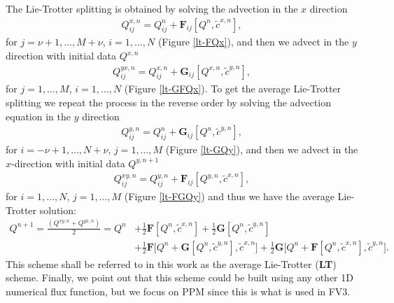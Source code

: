 The Lie-Trotter splitting is obtained by solving the advection in the $x$ direction
\begin{align*}
	{Q}^{x,n}_{ij} =  {Q}^{n}_{ij} + \mathbf{F}_{ij}[{Q^n}, \tilde{c}^{x,n}],
\end{align*}
for $j=\nu+1, \ldots, M+\nu$, $i=1, \ldots, N$ (Figure \ref{lt-FQx}), and then we advect in the $y$ direction with initial data ${Q}^{x,n}$ 
\begin{align*}
	{Q}^{yx,n}_{ij} = Q^{x,n}_{ij} + \mathbf{G}_{ij}[{Q}^{x,n},\tilde{c}^{y,n}],
\end{align*}
for $j=1, \ldots, M$,  $i=1, \ldots, N$  (Figure \ref{lt-GFQx}).
To get the average Lie-Trotter splitting we repeat the process in the reverse order by solving the advection equation
in the $y$ direction
\begin{align*}
	{Q}^{y,n}_{ij} =  {Q}^{n}_{ij} + \mathbf{G}_{ij}[{Q^n},\tilde{c}^{y,n}],
\end{align*}
for $i=-\nu+1, \ldots, N+\nu$, $j=1, \ldots, M$ (Figure \ref{lt-GQy}), and then we advect in the $x$-direction with initial data ${Q}^{y,n+1}$ 
\begin{align*}
	{Q}^{xy,n}_{ij} = Q^{y,n}_{ij} + \mathbf{F}_{ij}[Q^{y,n},\tilde{c}^{x,n}],
\end{align*}
for $i=1, \ldots, N$, $j=1, \ldots, M$ (Figure \ref{lt-FGQy}) and thus we have the average Lie-Trotter solution:
\begin{align}
\label{chp-adv2d-LT}
    Q^{n+1} = \frac{(Q^{xy,n} + Q^{yx,n})}{2} 
    = Q^n &+ \frac{1}{2}\mathbf{F}[Q^n,\tilde{c}^{x,n}] + \frac{1}{2}\mathbf{G}[Q^n,\tilde{c}^{y,n}] \nonumber \\
    &+\frac{1}{2}\mathbf{F}\bigg[Q^n + \mathbf{G}[Q^n, \tilde{c}^{y,n}], \tilde{c}^{x,n}\bigg]+
    \frac{1}{2}\mathbf{G}\bigg[Q^n + \mathbf{F}[Q^n, \tilde{c}^{x,n}], \tilde{c}^{y,n}\bigg].
\end{align}
This scheme shall be referred to in this work as the average Lie-Trotter (\textbf{LT}) scheme. 
Finally, we point out that this scheme could be built using any other 1D numerical flux function, 
but we focus on PPM since this is what is used in FV3.
